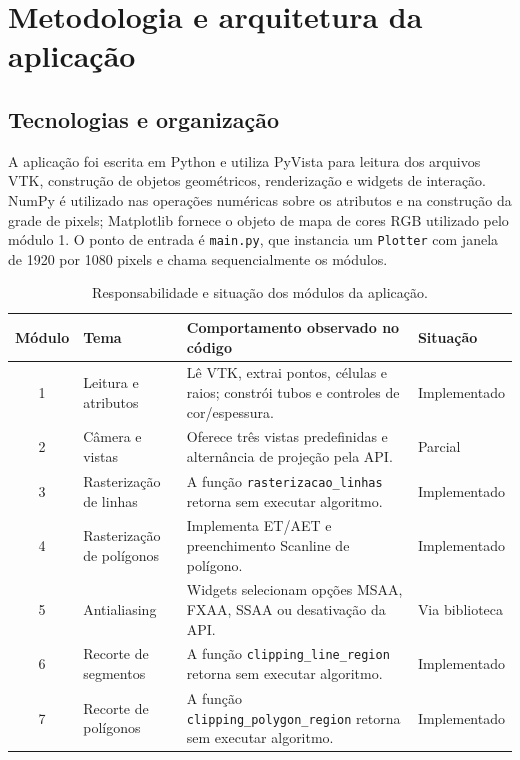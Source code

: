\section{Metodologia e arquitetura da aplicação}

\subsection{Tecnologias e organização}

A aplicação foi escrita em Python e utiliza PyVista para leitura dos arquivos VTK, construção de objetos geométricos, renderização e widgets de interação. NumPy é utilizado nas operações numéricas sobre os atributos e na construção da grade de pixels; Matplotlib fornece o objeto de mapa de cores RGB utilizado pelo módulo 1. O ponto de entrada é \texttt{main.py}, que instancia um \texttt{Plotter} com janela de 1920 por 1080 pixels e chama sequencialmente os módulos.

\begin{table}[H]
\centering
\small
\caption{Responsabilidade e situação dos módulos da aplicação.}
\label{tab:modulos}
\begin{tabularx}{\textwidth}{c l X l}
\toprule
\textbf{Módulo} & \textbf{Tema} & \textbf{Comportamento observado no código} & \textbf{Situação}\\
\midrule
1 & Leitura e atributos & Lê VTK, extrai pontos, células e raios; constrói tubos e controles de cor/espessura. & Implementado\\
2 & Câmera e vistas & Oferece três vistas predefinidas e alternância de projeção pela API. & Parcial\\
3 & Rasterização de linhas & A função \texttt{rasterizacao\_linhas} retorna sem executar algoritmo. & Implementado\\
4 & Rasterização de polígonos & Implementa ET/AET e preenchimento Scanline de polígono. & Implementado\\
5 & Antialiasing & Widgets selecionam opções MSAA, FXAA, SSAA ou desativação da API. & Via biblioteca\\
6 & Recorte de segmentos & A função \texttt{clipping\_line\_region} retorna sem executar algoritmo. & Implementado\\
7 & Recorte de polígonos & A função \texttt{clipping\_polygon\_region} retorna sem executar algoritmo. & Implementado\\
\bottomrule
\end{tabularx}
\end{table}


